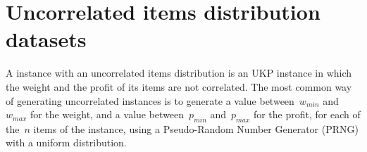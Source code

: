 



\section{Uncorrelated items distribution datasets}
\label{sec:inst_uncorrelated}


A instance with an uncorrelated items distribution is an UKP instance in which the weight and the profit of its items are not correlated.
The most common way of generating uncorrelated instances is to generate a value between~\(w_{min}\) and~\(w_{max}\) for the weight, and a value between~\(p_{min}\) and~\(p_{max}\) for the profit, for each of the~\(n\) items of the instance, using a Pseudo-Random Number Generator (PRNG) with a uniform distribution.

